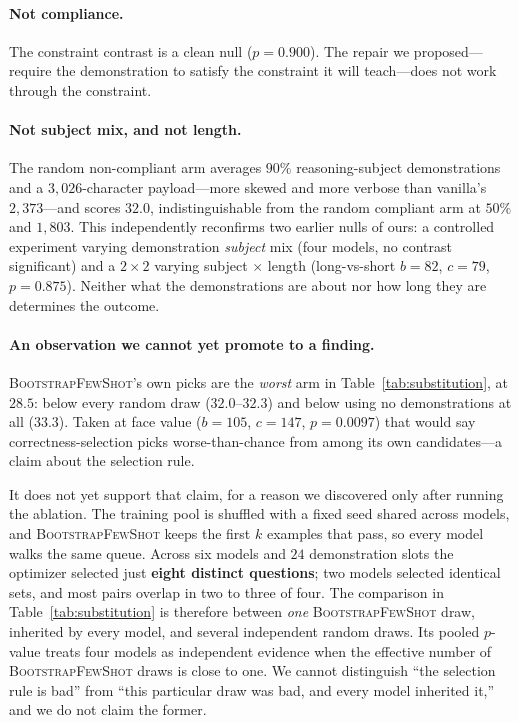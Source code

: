 \documentclass[11pt]{article}
\newcommand{\bsfs}{\textsc{BootstrapFewShot}}
\begin{document}
\paragraph{Not compliance.} The constraint contrast is a clean null ($p{=}0.900$). The
repair we proposed---require the demonstration to satisfy the constraint it will
teach---does not work through the constraint.

\paragraph{Not subject mix, and not length.} The random non-compliant arm averages
$90\%$ reasoning-subject demonstrations and a $3{,}026$-character payload---more skewed
and more verbose than vanilla's $2{,}373$---and scores $32.0$, indistinguishable from the
random compliant arm at $50\%$ and $1{,}803$. This independently reconfirms two earlier
nulls of ours: a controlled experiment varying demonstration \emph{subject} mix
(four models, no contrast significant) and a $2{\times}2$ varying subject $\times$ length
(long-vs-short $b{=}82$, $c{=}79$, $p{=}0.875$). Neither what the demonstrations are
about nor how long they are determines the outcome.

\paragraph{An observation we cannot yet promote to a finding.} \bsfs{}'s own picks are the
\emph{worst} arm in Table~\ref{tab:substitution}, at $28.5$: below every random draw
($32.0$--$32.3$) and below using no demonstrations at all ($33.3$). Taken at face value
($b{=}105$, $c{=}147$, $p{=}0.0097$) that would say correctness-selection picks
worse-than-chance from among its own candidates---a claim about the selection rule.

It does not yet support that claim, for a reason we discovered only after running the
ablation. The training pool is shuffled with a fixed seed shared across models, and
\bsfs{} keeps the first $k$ examples that pass, so every model walks the same queue.
Across six models and $24$ demonstration slots the optimizer selected just \textbf{eight
distinct questions}; two models selected identical sets, and most pairs overlap in two to
three of four. The comparison in Table~\ref{tab:substitution} is therefore between
\emph{one} \bsfs{} draw, inherited by every model, and several independent random draws.
Its pooled $p$-value treats four models as independent evidence when the effective number
of \bsfs{} draws is close to one. We cannot distinguish ``the selection rule is bad''
from ``this particular draw was bad, and every model inherited it,'' and we do not claim
the former.
\end{document}
